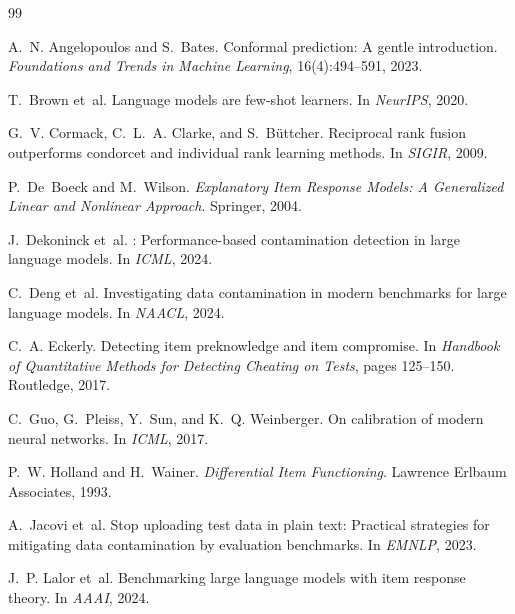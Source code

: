 \documentclass[11pt]{article}
\begin{document}
\begin{thebibliography}{99}

A.~N. Angelopoulos and S.~Bates.
\newblock Conformal prediction: A gentle introduction.
\newblock \emph{Foundations and Trends in Machine Learning}, 16(4):494--591, 2023.

T.~Brown et~al.
\newblock Language models are few-shot learners.
\newblock In \emph{NeurIPS}, 2020.

G.~V. Cormack, C.~L.~A. Clarke, and S.~B\"uttcher.
\newblock Reciprocal rank fusion outperforms condorcet and individual rank learning methods.
\newblock In \emph{SIGIR}, 2009.

P.~De~Boeck and M.~Wilson.
\newblock \emph{Explanatory Item Response Models: A Generalized Linear and Nonlinear Approach}.
\newblock Springer, 2004.

J.~Dekoninck et~al.
: Performance-based contamination detection in large language models.
\newblock In \emph{ICML}, 2024.

C.~Deng et~al.
\newblock Investigating data contamination in modern benchmarks for large language models.
\newblock In \emph{NAACL}, 2024.

C.~A. Eckerly.
\newblock Detecting item preknowledge and item compromise.
\newblock In \emph{Handbook of Quantitative Methods for Detecting Cheating on Tests}, pages 125--150. Routledge, 2017.

C.~Guo, G.~Pleiss, Y.~Sun, and K.~Q. Weinberger.
\newblock On calibration of modern neural networks.
\newblock In \emph{ICML}, 2017.

P.~W. Holland and H.~Wainer.
\newblock \emph{Differential Item Functioning}.
\newblock Lawrence Erlbaum Associates, 1993.

A.~Jacovi et~al.
\newblock Stop uploading test data in plain text: Practical strategies for mitigating data contamination by evaluation benchmarks.
\newblock In \emph{EMNLP}, 2023.

J.~P. Lalor et~al.
\newblock Benchmarking large language models with item response theory.
\newblock In \emph{AAAI}, 2024.


\end{thebibliography}
\end{document}
